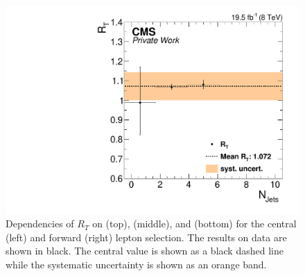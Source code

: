 \begin{figure}[htbp]
\begin{minipage}[t]{0.49\textwidth}
\end{minipage}
\begin{minipage}[t]{0.49\textwidth}
\includegraphics[width=\textwidth]{plots/BG/trigger/Triggereff_SFvsOF_Syst_AlphaT_HighHTExclusiveForward_Full2012_NJets_None.pdf}
\end{minipage}
\caption{Dependencies of $R_T$ on \mll (top), \MET (middle), and \njets (bottom) for the central (left) and forward (right) lepton selection. The results on data are shown in black. The central value is shown as a black dashed line while the systematic uncertainty is shown as an orange band.}
\label{fig:RTDependencies}
\end{figure} 
